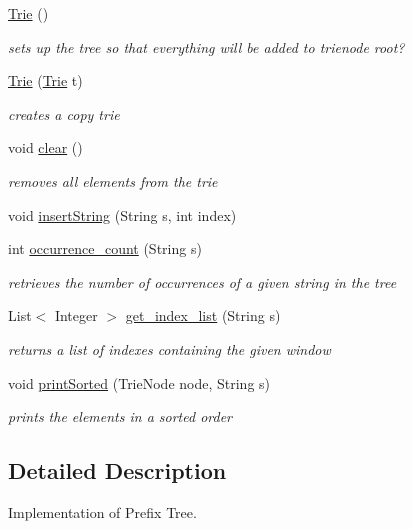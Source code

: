 \begin{DoxyCompactItemize}
\item 
\hyperlink{classtrie_1_1_trie_a73835e6c18e8a44616d8995fd8f8a359}{Trie} ()
\begin{DoxyCompactList}\small\item\em sets up the tree so that everything will be added to trienode root? \end{DoxyCompactList}\item 
\hyperlink{classtrie_1_1_trie_abcb888636eae05bbb59fb418fcf46732}{Trie} (\hyperlink{classtrie_1_1_trie}{Trie} t)
\begin{DoxyCompactList}\small\item\em creates a copy trie \end{DoxyCompactList}\item 
void \hyperlink{classtrie_1_1_trie_aeca1e283716cb4db6e52907049d08acb}{clear} ()
\begin{DoxyCompactList}\small\item\em removes all elements from the trie \end{DoxyCompactList}\item 
void \hyperlink{classtrie_1_1_trie_afc2ab785d2546e95b2698c46f76d9c77}{insert\+String} (String s, int index)
\item 
int \hyperlink{classtrie_1_1_trie_a061c92ea6abc9e1d9e6e6ac5c0c0b4b2}{occurrence\+\_\+count} (String s)
\begin{DoxyCompactList}\small\item\em retrieves the number of occurrences of a given string in the tree \end{DoxyCompactList}\item 
List$<$ Integer $>$ \hyperlink{classtrie_1_1_trie_a0755a2fdc3ebc07406db5a5ff1310f38}{get\+\_\+index\+\_\+list} (String s)
\begin{DoxyCompactList}\small\item\em returns a list of indexes containing the given window \end{DoxyCompactList}\item 
void \hyperlink{classtrie_1_1_trie_a3faeec11a80f63081cde7973fe32be50}{print\+Sorted} (Trie\+Node node, String s)
\begin{DoxyCompactList}\small\item\em prints the elements in a sorted order \end{DoxyCompactList}\end{DoxyCompactItemize}


\subsection{Detailed Description}
Implementation of Prefix Tree. 

